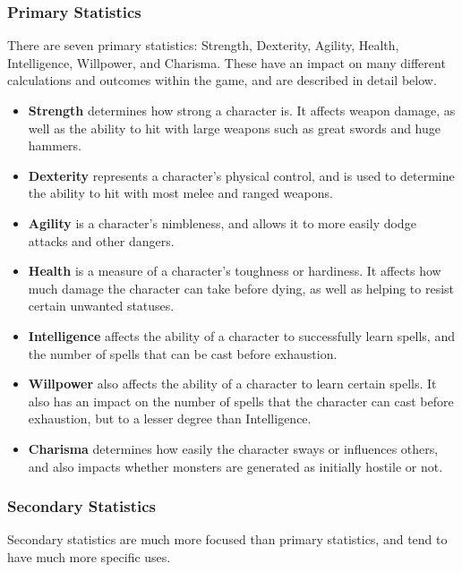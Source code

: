 \subsubsection{Primary Statistics}

There are seven primary statistics: Strength, Dexterity, Agility, Health,
Intelligence, Willpower, and Charisma.  These have an impact on many
different calculations and outcomes within the game, and are described
in detail below.

\begin{itemize}
\item {\bf Strength} determines how strong a character is.  It affects
weapon damage, as well as the ability to hit with large weapons such as
great swords and huge hammers.

\item {\bf Dexterity} represents a character's physical control, and is
used to determine the ability to hit with most melee and ranged weapons.

\item {\bf Agility} is a character's nimbleness, and allows it to more
easily dodge attacks and other dangers.

\item {\bf Health} is a measure of a character's toughness or hardiness.
It affects how much damage the character can take before dying, as well
as helping to resist certain unwanted statuses.

\item {\bf Intelligence} affects the ability of a character to successfully
learn spells, and the number of spells that can be cast before exhaustion.

\item {\bf Willpower} also affects the ability of a character to learn
certain spells.  It also has an impact on the number of spells that the
character can cast before exhaustion, but to a lesser degree than
Intelligence.

\item {\bf Charisma} determines how easily the character sways or
influences others, and also impacts whether monsters are generated as
initially hostile or not.

\end{itemize}
\subsubsection{Secondary Statistics}

Secondary statistics are much more focused than primary statistics, and
tend to have much more specific uses.

